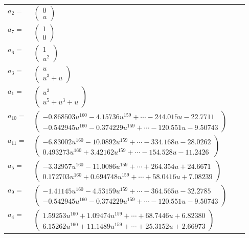 \documentclass[1p]{elsarticle_modified}
\theoremstyle{definition}
\begin{document}
\begin{tabular}{m{7pt} m{180pt} m{7pt} m{180pt} }
\flushright $a_{2}=$&$\begin{pmatrix}0\\u\end{pmatrix}$ \\
\flushright $a_{7}=$&$\begin{pmatrix}1\\0\end{pmatrix}$ \\
\flushright $a_{6}=$&$\begin{pmatrix}1\\u^2\end{pmatrix}$ \\
\flushright $a_{3}=$&$\begin{pmatrix}u\\u^3+u\end{pmatrix}$ \\
\flushright $a_{1}=$&$\begin{pmatrix}u^3\\u^5+u^3+u\end{pmatrix}$ \\
\flushright $a_{10}=$&$\begin{pmatrix}-0.868503 u^{160}-4.15736 u^{159}+\cdots-244.015 u-22.7711\\-0.542945 u^{160}-0.374229 u^{159}+\cdots-120.551 u-9.50743\end{pmatrix}$ \\
\flushright $a_{11}=$&$\begin{pmatrix}-6.83002 u^{160}-10.0892 u^{159}+\cdots-334.168 u-28.0262\\0.493273 u^{160}+3.42162 u^{159}+\cdots-154.528 u-11.2426\end{pmatrix}$ \\
\flushright $a_{5}=$&$\begin{pmatrix}-3.32957 u^{160}-11.0086 u^{159}+\cdots+264.354 u+24.6671\\0.172703 u^{160}+0.694748 u^{159}+\cdots+58.0416 u+7.08239\end{pmatrix}$ \\
\flushright $a_{9}=$&$\begin{pmatrix}-1.41145 u^{160}-4.53159 u^{159}+\cdots-364.565 u-32.2785\\-0.542945 u^{160}-0.374229 u^{159}+\cdots-120.551 u-9.50743\end{pmatrix}$ \\
\flushright $a_{4}=$&$\begin{pmatrix}1.59253 u^{160}+1.09474 u^{159}+\cdots+68.7446 u+6.82380\\6.15262 u^{160}+11.1489 u^{159}+\cdots+25.3152 u+2.66973\end{pmatrix}$ \\

\end{tabular}
\end{document}
